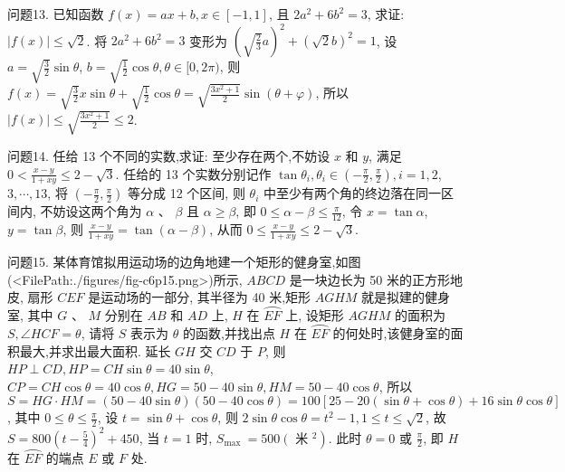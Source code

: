 问题13. 已知函数 $f(x)=a x+b, x \in[-1,1]$, 且 $2 a^2+6 b^2=3$, 求证: $|f(x)| \leqslant \sqrt{2}$.
将 $2 a^2+6 b^2=3$ 变形为 $\left(\sqrt{\frac{2}{3}} a\right)^2+(\sqrt{2} b)^2=1$, 设 $a=\sqrt{\frac{3}{2}} \sin \theta$, $b=\sqrt{\frac{1}{2}} \cos \theta, \theta \in[0,2 \pi)$, 则 $f(x)=\sqrt{\frac{3}{2}} x \sin \theta+\sqrt{\frac{1}{2}} \cos \theta= \sqrt{\frac{3 x^2+1}{2}} \sin (\theta+\varphi)$, 所以 $|f(x)| \leqslant \sqrt{\frac{3 x^2+1}{2}} \leqslant 2$.



问题14. 任给 13 个不同的实数,求证: 至少存在两个,不妨设 $x$ 和 $y$, 满足 $0< \frac{x-y}{1+x y} \leqslant 2-\sqrt{3}$.
任给的 13 个实数分别记作 $\tan \theta_i, \theta_i \in\left(-\frac{\pi}{2}, \frac{\pi}{2}\right), i=1,2$, $3, \cdots, 13$, 将 $\left(-\frac{\pi}{2}, \frac{\pi}{2}\right)$ 等分成 12 个区间, 则 $\theta_i$ 中至少有两个角的终边落在同一区间内, 不妨设这两个角为 $\alpha$ 、 $\beta$ 且 $\alpha \geqslant \beta$, 即 $0 \leqslant \alpha-\beta \leqslant \frac{\pi}{12}$, 令 $x=\tan \alpha$, $y=\tan \beta$, 则 $\frac{x-y}{1+x y}=\tan (\alpha-\beta)$, 从而 $0 \leqslant \frac{x-y}{1+x y} \leqslant 2-\sqrt{3}$.



问题15. 某体育馆拟用运动场的边角地建一个矩形的健身室,如图(<FilePath:./figures/fig-c6p15.png>)所示, $A B C D$ 是一块边长为 50 米的正方形地皮, 扇形 $C E F$ 是运动场的一部分, 其半径为 40 米,矩形 $A G H M$ 就是拟建的健身室, 其中 $G$ 、 $M$ 分别在 $A B$ 和 $A D$ 上, $H$ 在 $\overparen{E F}$ 上, 设矩形 $A G H M$ 的面积为 $S, \angle H C F=\theta$, 请将 $S$ 表示为 $\theta$ 的函数,并找出点 $H$ 在 $\overparen{E F}$ 的何处时,该健身室的面积最大,并求出最大面积.
延长 $G H$ 交 $C D$ 于 $P$, 则 $H P \perp C D, H P=C H \sin \theta=40 \sin \theta$, $C P=C H \cos \theta=40 \cos \theta, H G=50-40 \sin \theta, H M=50-40 \cos \theta$, 所以 $S= H G \cdot H M=(50-40 \sin \theta)(50-40 \cos \theta)=100[25-20(\sin \theta+\cos \theta)+ 16 \sin \theta \cos \theta]$, 其中 $0 \leqslant \theta \leqslant \frac{\pi}{2}$, 设 $t=\sin \theta+\cos \theta$, 则 $2 \sin \theta \cos \theta=t^2-1,1 \leqslant t \leqslant \sqrt{2}$, 故 $S=800\left(t-\frac{5}{4}\right)^2+450$, 当 $t=1$ 时, $S_{\text {max }}=500\left(\right.$ 米 $\left.^2\right)$. 此时 $\theta=0$ 或 $\frac{\pi}{2}$, 即 $H$ 在 $\overparen{E F}$ 的端点 $E$ 或 $F$ 处.



